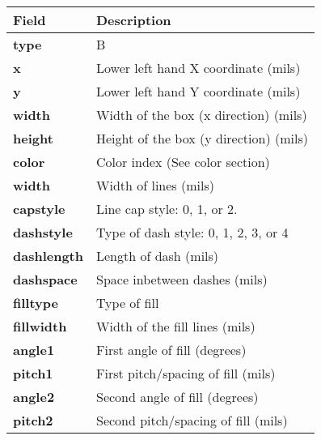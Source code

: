 \documentclass{article}
\begin{document}
\begin{table}[h]
\begin{tabular}{|l|l|} \hline
Field & Description \\ \hline \hline
{\bf type} & B \\ \hline
{\bf x} & Lower left hand X coordinate (mils) \\ \hline 
{\bf y} & Lower left hand Y coordinate  (mils)\\ \hline
{\bf width} & Width of the box (x direction) (mils) \\ \hline
{\bf height} & Height of the box (y direction) (mils) \\ \hline
{\bf color} & Color index (See color section) \\ \hline
{\bf width} & Width of lines (mils) \\ \hline
{\bf capstyle} & Line cap style: 0, 1, or 2. \\ \hline
{\bf dashstyle} & Type of dash style: 0, 1, 2, 3, or 4 \\ \hline
{\bf dashlength} & Length of dash (mils) \\ \hline
{\bf dashspace} & Space inbetween dashes (mils) \\ \hline
{\bf filltype} & Type of fill \\ \hline
{\bf fillwidth} & Width of the fill lines (mils) \\ \hline
{\bf angle1} & First angle of fill (degrees) \\ \hline
{\bf pitch1} & First pitch/spacing of fill (mils) \\ \hline
{\bf angle2} & Second angle of fill (degrees) \\ \hline
{\bf pitch2} & Second pitch/spacing of fill (mils) \\ \hline
\end{tabular}
\end{table}
\end{document}

